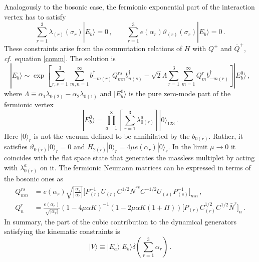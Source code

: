 \documentclass[12pt]{article}
\def\L{\Lambda}
\def\a{\alpha}
\def\d{\delta}
\def\m{\mu}
\def\s{\sigma}
\def\l{\lambda}
\def\vt{\vartheta}
\def\ra{\rangle}
\def\dg{\dagger}
\numberwithin{equation}{section} \setlength{\textwidth}{17cm}
\begin{document}
\noindent Analogously to the bosonic case, the fermionic exponential part of the
interaction vertex has to satisfy \cite{gs,gsb}
\begin{equation}\label{kinf}
\sum_{r=1}^3\l_{(r)}(\s_r)|E_b\ra=0\,,\qquad
\sum_{r=1}^3e(\a_r)\vt_{(r)}(\s_r)|E_b\ra=0\,.
\end{equation}
These constraints arise from the commutation relations of $H$ with $Q^+$ and $\bar{Q}^+$,
{\it cf}.\ equation \eqref{comm}. The solution is \cite{ap}
\begin{equation}\label{fv}
|E_b\ra \sim
\exp\left[\sum_{r,s=1}^3\sum_{m,n=1}^{\infty}b^{\dg}_{-m(r)}Q^{rs}_{mn}b^{\dg}_{n(s)}
-\sqrt{2}\L\sum_{r=1}^3\sum_{m=1}^{\infty}Q^r_mb^{\dg}_{-m(r)}\right]|E_b^0\ra\,,
\end{equation}
where $\L\equiv\a_1\l_{0(2)}-\a_2\l_{0(1)}$ and $|E_b^0\ra$ is the pure zero-mode part of
the fermionic vertex
\begin{equation}\label{zero}
|E^0_b\ra=\prod_{a=1}^8\left[\sum_{r=1}^3\l_{0(r)}^a\right]|0\ra_{123}\,.
\end{equation}
Here $|0\ra_r$ is not the vacuum defined to be annihilated by the $b_{0(r)}$. Rather,
it satisfies $\vt_{0(r)}|0\ra_r=0$ and $H_{2(r)}|0\ra_r=4\m e(\a_r)|0\ra_r$. 
In the limit $\m\to 0$ it coincides with the
flat space state that generates the massless multiplet by acting with $\l_{0(r)}^a$ on it.
The fermionic Neumann matrices can be expressed in terms of the bosonic ones as \cite{ap}
\begin{align}
\label{qmn}
Q^{rs}_{mn} & =e(\a_r)\sqrt{\left|\frac{\a_s}{\a_r}\right|}
\bigl[P_{(r)}^{-1}U_{(r)}C^{1/2}\bar{N}^{rs}C^{-1/2}U_{(s)}P_{(s)}^{-1}\bigr]_{mn}\,,\\
\label{qm}
Q^r_n & =\frac{e(\a_r)}{\sqrt{|\a_r|}}(1-4\m\a
K)^{-1}(1-2\m\a K(1+\Pi))\bigl[P_{(r)}C_{(r)}^{1/2}C^{1/2}\bar{N}^r\bigr]_n\,.
\end{align}
In summary, the part of the cubic contribution to the dynamical generators satisfying the
kinematic constraints is
\begin{equation}
|V\ra\equiv|E_a\ra|E_b\ra\d\left(\sum_{r=1}^3\a_r\right)\,.
\end{equation}
\end{document}
